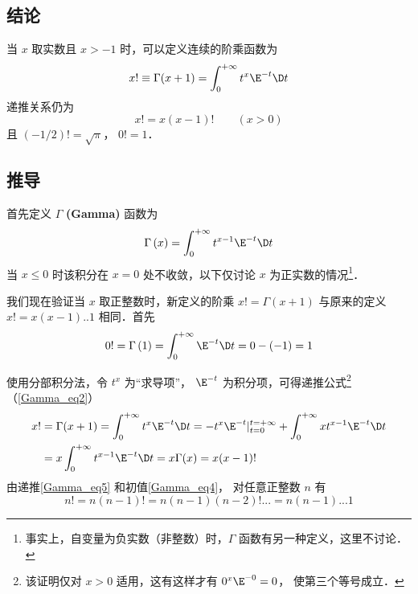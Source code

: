 

\subsection{结论}
当 $x$ 取实数且 $x>-1$ 时，可以定义连续的阶乘函数为
\begin{equation}
x! \equiv \Gamma (x + 1) = \int_0^{ + \infty } {{t^x}{\E^{ - t}}\D t} 
\end{equation}
递推关系仍为
\begin{equation}\label{Gamma_eq2}
x!=x(x-1)! \qquad (x>0)
\end{equation}
且 $(-1/2)!=\sqrt{\pi}$，  $0! = 1$．

\subsection{推导}

首先定义 $\Gamma$ \textbf{(Gamma)} 函数为
\begin{equation}
\Gamma \left( x \right) = \int_0^{ + \infty } {{t^{x - 1}}{\E^{ - t}}\D t} 
\end{equation}
当 $x \le 0$ 时该积分在 $x=0$ 处不收敛，以下仅讨论 $x$ 为正实数的情况\footnote{事实上，自变量为负实数（非整数）时，$\Gamma$ 函数有另一种定义，这里不讨论．}．

我们现在验证当 $x$ 取正整数时，新定义的阶乘 $x! = \Gamma(x+1)$ 与原来的定义 $x! = x(x-1)..1$ 相同．首先
\begin{equation}\label{Gamma_eq4}
0! = \Gamma \left( 1 \right) = \int_0^{ + \infty } {\E^{ - t}\D t} = 0-(-1) = 1
\end{equation}

使用分部积分法，令 ${t^x}$ 为“求导项”， ${\E^{ - t}}$ 为积分项，可得递推公式\footnote{该证明仅对 $x>0$ 适用，这有这样才有 $0^x \E^{-0}=0$， 使第三个等号成立．}（\autoref{Gamma_eq2}）
\begin{equation}\label{Gamma_eq5}
\begin{aligned}
x! &= \Gamma ( x+1) = \int_0^{ + \infty } {{t^x}{\E^{ - t}}\D t} =  - {t^x}{\E^{ - t}}|_{t = 0}^{t =  + \infty } + \int_0^{ + \infty } {x{t^{x - 1}}{\E^{ - t}}\D t} \\
&= x\int_0^{ + \infty } {{t^{x - 1}}{\E^{ - t}}\D t} = x\Gamma (x) = x(x-1)!
\end{aligned} \end{equation} 
由递推\autoref{Gamma_eq5} 和初值\autoref{Gamma_eq4}， 对任意正整数 $n$ 有
\begin{equation}
n! = n(n-1)! = n(n-1)(n-2)!... = n(n-1)...1
\end{equation}

